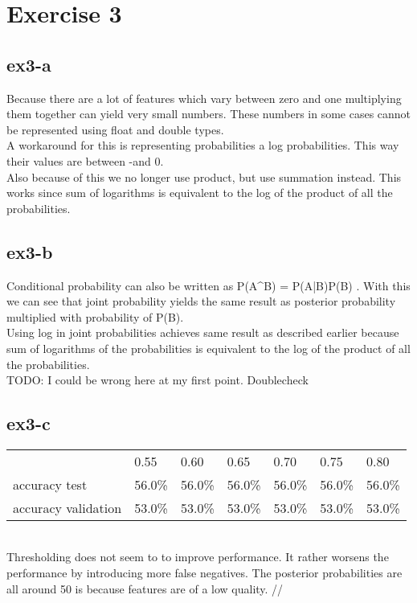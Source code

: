 \section{Exercise 3}
\subsection{ex3-a}
Because there are a lot of features which vary between zero and one multiplying them together can yield very small
numbers. These numbers in some cases cannot be represented using float and double types.\\
A workaround for this is representing probabilities a log probabilities. This way their values are between -\infty and 0.\\
Also because of this we no longer use product, but use summation instead. This works since sum of logarithms is
equivalent to the log of the product of all the probabilities.

\subsection{ex3-b}
Conditional probability can also be written as P(A^B) = P(A|B)P(B) . With this we can see that joint probability yields
the same result as posterior probability multiplied with probability of P(B). \\
Using log in joint probabilities achieves same result as described earlier because sum of logarithms of the
probabilities is equivalent to the log of the product of all the probabilities.
\\
TODO: I could be wrong here at my first point. Doublecheck

\subsection{ex3-c}
\begin{table}[]
\begin{tabular}{l|llllll}
                    & 0.55   & 0.60   & 0.65   & 0.70   & 0.75   & 0.80   \\ \cline{2-7}
accuracy test       & 56.0\% & 56.0\% & 56.0\% & 56.0\% & 56.0\% & 56.0\% \\ \cline{2-7}
accuracy validation & 53.0\% & 53.0\% & 53.0\% & 53.0\% & 53.0\% & 53.0\%
\end{tabular}
\end{table}
\\
Thresholding does not seem to to improve performance. It rather worsens the performance by introducing more false
negatives. The posterior probabilities are all around 50%
is because features are of a low quality.
//


